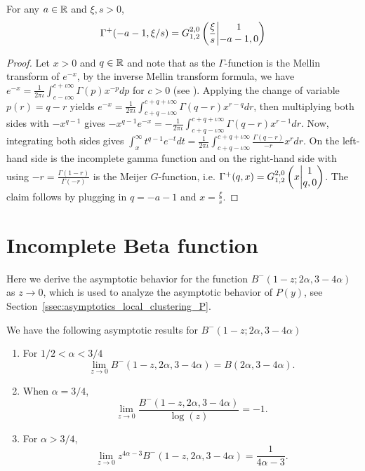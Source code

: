 \begin{appendices}
\begin{lemma}\label{lem:gamma_meijer_G}
For any $a\in \R$ and $\xi, s>0$,
$$\Gamma^+(-a-1,\xi/s) = \MeijerGnew{2}{0}{1}{2}{1}{-a-1,0}{\frac{\xi}{s}}$$
\end{lemma}
\begin{proof}
Let $x>0$ and $q\in\R$ and note that as the $\Gamma$-function is the Mellin transform of $e^{-x}$, by the inverse Mellin transform formula, we have $e^{-x}=\frac{1}{2\pi \iota}\int_{c-\iota\infty}^{c+\iota\infty} \Gamma(p)x^{-p}dp$ for $c>0$ (see \cite[p.196]{davies2012integral}). Applying the change of variable $p(r)=q-r$ yields $e^{-x}=\frac{1}{2\pi \iota}\int_{c+q-\iota\infty}^{c+q+\iota\infty} \Gamma(q-r) x^{r-q}dr$, then multiplying both sides with $-x^{q-1}$ gives $-x^{q-1}e^{-x} = -\frac{1}{2\pi \iota}\int_{c+q-\iota\infty}^{c+q+\iota\infty} \Gamma(q-r) x^{r-1}dr$. Now, integrating both sides gives $\int_x^\infty t^{q-1}e^{-t}dt = \frac{1}{2\pi \iota}\int_{c+q-\iota\infty}^{c+q+\iota\infty}\frac{\Gamma(q-r)}{-r}x^r dr$. On the left-hand side is the incomplete gamma function and on the right-hand side with using $-r= \frac{\Gamma(1-r)}{\Gamma(-r)}$ is the Meijer $G$-function, i.e. $\Gamma^+(q,x)=\MeijerGnew{2}{0}{1}{2}{1}{q,0}{x}$. The claim follows by plugging in $q=-a-1$ and $x=\frac{\xi}{s}$.
\end{proof}

\section{Incomplete Beta function}\label{sec:beta_function}

Here we derive the asymptotic behavior for the function $B^-(1-z; 2\alpha, 3-4\alpha )$ as $z \to 0$, which is used to analyze the asymptotic behavior of $P(y)$, see Section~\ref{ssec:asymptotics_local_clustering_P}.

\begin{lemma}\label{lem:asymptotics_incomplete_beta}
We have the following asymptotic results for $B^-(1-z; 2\alpha, 3-4\alpha )$
\begin{enumerate}
\item For $1/2 < \alpha < 3/4$
\[
	\lim_{z \to 0} B^-(1-z, 2\alpha, 3-4\alpha ) = B(2\alpha, 3 - 4\alpha).
\]
\item When $\alpha = 3/4$,
\[
	\lim_{z \to 0} \frac{B^-(1-z, 2\alpha, 3-4\alpha)}{\log(z)} = -1.
\]
\item For $\alpha > 3/4$,
\[
	\lim_{z \to 0} z^{4\alpha - 3} B^-(1-z, 2\alpha, 3-4\alpha ) = \frac{1}{4\alpha - 3}.
\]
\end{enumerate}
\end{lemma}


\end{appendices}
